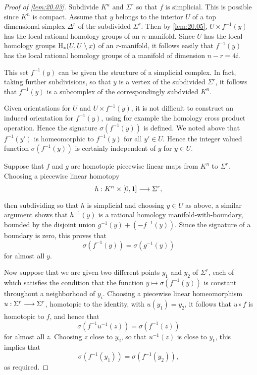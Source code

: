 \documentclass[../main]{subfiles}
\begin{document}
\begin{proof}[Proof of \ref{lem:20.03}]
Subdivide $K^n$ and $\Sigma^r$ so that $f$ is simplicial. This is possible since $K^n$ is compact. Assume that $y$ belongs to the interior $U$ of a top dimensional simplex $\Delta^r$ of the subdivided $\Sigma^r$. Then by \ref{lem:20.05}, $U \times f^{-1}(y)$ has the local rational homology groups of an $n$-manifold. Since $U$ has the local homology groups $\operatorname{H}_\ast(U,U\setminus x)$ of an $r$-manifold, it follows easily that $f^{-1}(y)$ has the local rational homology groups of a manifold of dimension $n-r = 4i$.

This set $f^{-1}(y)$ can be given the structure of a simplicial complex. In fact, taking further subdivisions, so that $y$ is a vertex of the subdivided $\Sigma^r$, it follows that $f^{-1}(y)$ is a subcomplex of the correspondingly subdvided $K^n$.

Given orientations for $U$ and $U \times f^{-1}(y)$, it is not difficult to construct an induced orientation for $f^{-1}(y)$, using for example the homology cross product operation. Hence the signature $\sigma(f^{-1}(y))$ is defined. We noted above that $f^{-1}(y')$ is homeomorphic to $f^{-1}(y)$ for all $y' \in U$. Hence the integer valued function $\sigma(f^{-1}(y))$ is certainly independent of $y$ for $y \in U$.

Suppose that $f$ and $g$ are homotopic piecewise linear maps from $K^n$ to $\Sigma^r$. Choosing a piecewise linear homotopy \[h:K^n \times [0,1] \varrightarrow{} \Sigma^r,\] then subdividing so that $h$ is simplicial and choosing $y \in U$ as above, a similar argument shows that $h^{-1}(y)$ is a rational homology manifold-with-boundary, bounded by the disjoint union $g^{-1}(y) + (-f^{-1}(y))$. Since the signature of a boundary is zero, this proves that \[\sigma(f^{-1}(y)) = \sigma(g^{-1}(y)) \] for almost all $y$.

Now suppose that we are given two different points $y_1$ and $y_2$ of $\Sigma^r$, each of which satisfies the condition that the function $y \mapsto \sigma(f^{-1}(y))$ is constant throughout a neighborhood of $y_i$. Choosing a piecewise linear homeomorphism $u:\Sigma^r \varrightarrow{} \Sigma^r$, homotopic to the identity, with $u(y_1) = y_2$, it follows that $u \circ f$ is homotopic to $f$, and hence that \[\sigma(f^{-1} u^{-1}(z)) = \sigma(f^{-1}(z))\] for almost all $z$. Choosing $z$ close to $y_2$, so that $u^{-1}(z)$ is close to $y_1$, this implies that \[\sigma(f^{-1}(y_1)) = \sigma(f^{-1}(y_2)),\] as required.
\end{proof}
\end{document}
